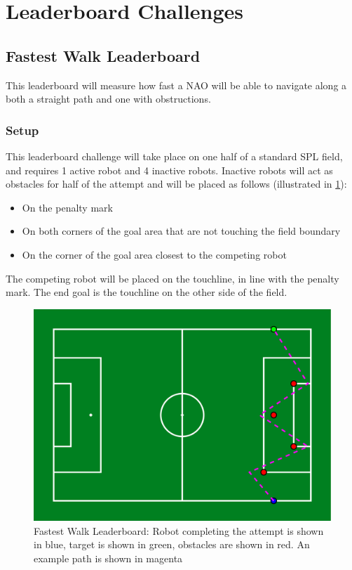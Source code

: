 
\section{Leaderboard Challenges}



\subsection{Fastest Walk Leaderboard}
This leaderboard will measure how fast a NAO will be able to navigate along a both a straight path and one with obstructions.

\subsubsection{Setup}
This leaderboard challenge will take place on one half of a standard SPL field, and requires 1 active robot and 4 inactive robots.
Inactive robots will act as obstacles for half of the attempt and will be placed as follows (illustrated in \cref{fig:walk_leaderboard}):
\begin{itemize}
    \item On the penalty mark
    \item On both corners of the goal area that are not touching the field boundary
    \item On the corner of the goal area closest to the competing robot
\end{itemize}

The competing robot will be placed on the touchline, in line with the penalty mark.
The end goal is the touchline on the other side of the field.

\begin{figure}[t]
    \centerline{\includegraphics[width=\columnwidth]{figs/walk_leaderboard.pdf}}
    \caption{Fastest Walk Leaderboard: Robot completing the attempt is shown in blue, target is shown in green, obstacles are shown in red. An example path is shown in magenta}
    \label{fig:walk_leaderboard}
\end{figure}


